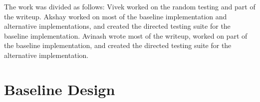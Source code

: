 \documentclass[10pt]{article}
\begin{document}
The work was divided as follows:
Vivek worked on the random testing and part of the writeup.
Akshay worked on most of the baseline implementation and alternative implementations, and created the directed testing suite for the baseline implementation.
Avinash wrote most of the writeup, worked on part of the baseline implementation, and created the directed testing suite for the alternative implementation. \\






\section{Baseline Design}
\end{document}
